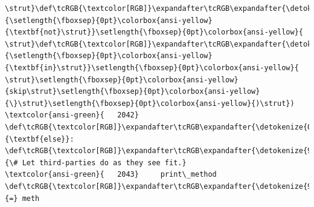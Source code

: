 \documentclass[11pt]{article}
\begin{document}
\begin{Verbatim}[commandchars=\\\{\}, frame=single, framerule=2mm, rulecolor=\color{outerrorbackground}]
\strut}\def\tcRGB{\textcolor[RGB]}\expandafter\tcRGB\expandafter{\detokenize{175,0,255}}{\setlength{\fboxsep}{0pt}\colorbox{ansi-yellow}{\textbf{not}\strut}}\setlength{\fboxsep}{0pt}\colorbox{ansi-yellow}{ \strut}\def\tcRGB{\textcolor[RGB]}\expandafter\tcRGB\expandafter{\detokenize{175,0,255}}{\setlength{\fboxsep}{0pt}\colorbox{ansi-yellow}{\textbf{in}\strut}}\setlength{\fboxsep}{0pt}\colorbox{ansi-yellow}{ \strut}\setlength{\fboxsep}{0pt}\colorbox{ansi-yellow}{skip\strut}\setlength{\fboxsep}{0pt}\colorbox{ansi-yellow}{\}\strut}\setlength{\fboxsep}{0pt}\colorbox{ansi-yellow}{)\strut})
\textcolor{ansi-green}{   2042} \def\tcRGB{\textcolor[RGB]}\expandafter\tcRGB\expandafter{\detokenize{0,135,0}}{\textbf{else}}:  \def\tcRGB{\textcolor[RGB]}\expandafter\tcRGB\expandafter{\detokenize{95,135,135}}{\# Let third-parties do as they see fit.}
\textcolor{ansi-green}{   2043}     print\_method \def\tcRGB{\textcolor[RGB]}\expandafter\tcRGB\expandafter{\detokenize{98,98,98}}{=} meth


\end{Verbatim}
\end{document}
